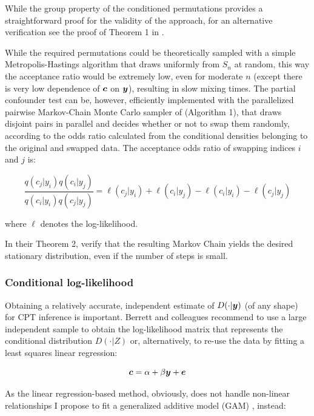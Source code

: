 \documentclass{article}
\begin{document}
While the group property of the conditioned permutations provides a straightforward proof for the validity of the approach, for an alternative verification see the proof of Theorem 1 in \citep{berrett2020conditional}.

While the required permutations could be theoretically sampled with a simple Metropolis-Hastings algorithm that draws uniformly from $S_n$ at random, this way the acceptance ratio would be extremely low, even for moderate $n$ (except there is very low dependence of $\boldsymbol{c}$ on $\boldsymbol{y}$), resulting in slow mixing times. The partial confounder test can be, however, efficiently implemented with the parallelized pairwise Markov-Chain Monte Carlo sampler of \cite{berrett2020conditional} (Algorithm 1), that draws disjoint pairs in parallel and decides whether or not to swap them randomly, according to the odds ratio calculated from the conditional densities belonging to the original and swapped data. The acceptance odds ratio of swapping indices $i$ and $j$ is:

\begin{equation}
\frac{ q(c_j | y_i) q(c_i | y_j)}{q(c_i | y_i) q(c_j | y_j) }
=
\ell(c_j | y_i) + \ell(c_i | y_j) - \ell(c_i | y_i) - \ell(c_j | y_j) 
\label{eq:accept-odds}
\end{equation}

where $\ell$ denotes the log-likelihood.

In their Theorem 2, \cite{berrett2020conditional} verify that the resulting Markov Chain yields the desired stationary distribution, even if the number of steps is small.

\subsubsection*{Conditional log-likelihood}


Obtaining a relatively accurate, independent estimate of $D(\cdot|\boldsymbol{y})$ (of any shape) for CPT inference is important. Berrett and colleagues recommend to use a large independent sample to obtain the log-likelihood matrix that represents the conditional distribution $D(\cdot|Z)$ or, alternatively, to re-use the data by fitting a least squares linear regression:

\begin{equation}
    \label{eq:linreg}
    \boldsymbol{c} = \alpha + \beta \boldsymbol{y} + \boldsymbol{e}
\end{equation}

As the linear regression-based method, obviously, does not handle non-linear relationships I propose to fit a generalized additive model (GAM) \citep{hastie1987generalized}, instead:
\end{document}
